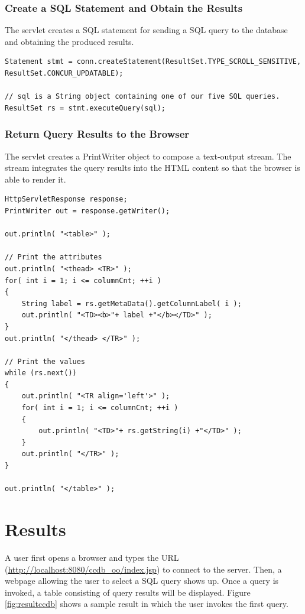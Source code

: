 \documentclass[11pt]{article}
\begin{document}
\subsubsection{Create a SQL Statement and Obtain the Results}
The servlet creates a SQL statement for sending a SQL query to the database and obtaining the produced results.
\begin{verbatim}
Statement stmt = conn.createStatement(ResultSet.TYPE_SCROLL_SENSITIVE, ResultSet.CONCUR_UPDATABLE);

// sql is a String object containing one of our five SQL queries.
ResultSet rs = stmt.executeQuery(sql);
\end{verbatim}

\subsubsection{Return Query Results to the Browser}
The servlet creates a PrintWriter object to compose a text-output stream. The stream integrates the query results into the HTML content so that the browser is able to render it.
\begin{verbatim}
HttpServletResponse response;
PrintWriter out = response.getWriter();

out.println( "<table>" );

// Print the attributes
out.println( "<thead> <TR>" );
for( int i = 1; i <= columnCnt; ++i )
{
    String label = rs.getMetaData().getColumnLabel( i );
    out.println( "<TD><b>"+ label +"</b></TD>" );
}
out.println( "</thead> </TR>" );

// Print the values
while (rs.next())
{
    out.println( "<TR align='left'>" );
    for( int i = 1; i <= columnCnt; ++i )
    {
        out.println( "<TD>"+ rs.getString(i) +"</TD>" );
    }
    out.println( "</TR>" );
}

out.println( "</table>" );
\end{verbatim}

\section{Results}
A user first opens a browser and types the URL (\url{http://localhost:8080/ccdb_oo/index.jsp}) to connect to the server. Then, a webpage allowing the user to select a SQL query shows up. Once a query is invoked, a table consisting of query results will be displayed. Figure \ref{fig:resultccdb} shows a sample result in which the user invokes the first query.
\end{document}
